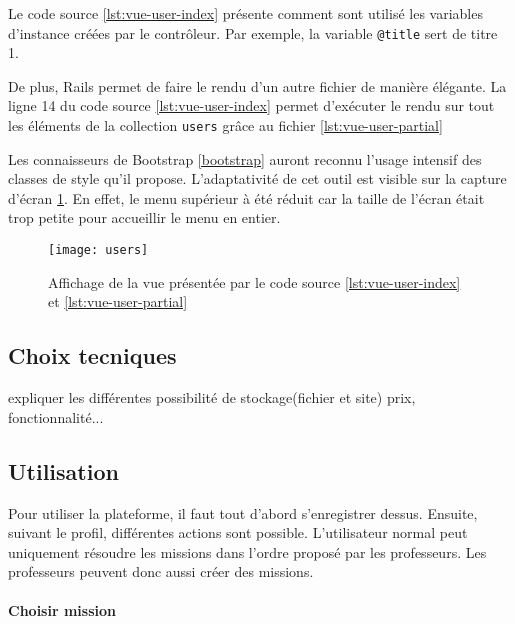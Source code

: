 
Le code source \ref{lst:vue-user-index} présente comment sont utilisé les variables d'instance créées par le contrôleur. Par exemple, la variable \texttt{@title} sert de titre 1.


De plus, Rails permet de faire le rendu d'un autre fichier de manière élégante. La ligne 14 du code source \ref{lst:vue-user-index} permet d'exécuter le rendu sur tout les éléments de la collection \texttt{users} grâce au fichier \ref{lst:vue-user-partial}

Les connaisseurs de Bootstrap \ref{bootstrap} auront reconnu l'usage intensif des classes de style qu'il propose. L'adaptativité de cet outil est visible sur la capture d'écran \ref{fig:vue-users}. En effet, le menu supérieur à été réduit car la taille de l'écran était trop petite pour accueillir le menu en entier.

\begin{figure}
  \begin{center}
    \texttt{[image: users]}
    \caption{Affichage de la vue présentée par le code source \ref{lst:vue-user-index} et \ref{lst:vue-user-partial}}
    \label{fig:vue-users}
  \end{center}
\end{figure}

\subsection{Choix tecniques}
expliquer les différentes possibilité de stockage(fichier et site) prix, fonctionnalité...

\subsection{Utilisation}
Pour utiliser la plateforme, il faut tout d'abord s'enregistrer dessus. Ensuite, suivant le profil, différentes actions sont possible. L'utilisateur normal peut uniquement résoudre les missions dans l'ordre proposé par les professeurs. Les professeurs peuvent donc aussi créer des missions.

\paragraph{Choisir mission}

